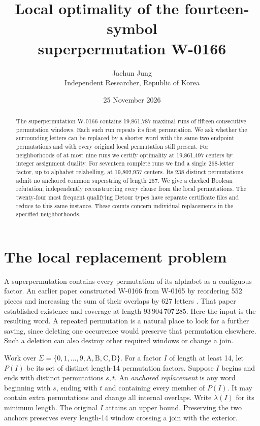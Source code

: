 \documentclass[11pt]{article}
\title{\bfseries Local optimality of the fourteen-symbol\\superpermutation W-0166}
\author{Jaehun Jung\\[3pt]\small Independent Researcher, Republic of Korea}
\date{25 November 2026}
\begin{document}
\maketitle
\begin{abstract}
The superpermutation W-0166 contains 19,861,787 maximal runs of fifteen consecutive permutation windows. Each such run repeats its first permutation. We ask whether the surrounding letters can be replaced by a shorter word with the same two endpoint permutations and with every original local permutation still present. For neighborhoods of at most nine runs we certify optimality at 19,861,497 centers by integer assignment duality. For seventeen complete runs we find a single 268-letter factor, up to alphabet relabelling, at 19,802,957 centers. Its 238 distinct permutations admit no anchored common superstring of length 267. We give a checked Boolean refutation, independently reconstructing every clause from the local permutations. The twenty-four most frequent qualifying Detour types have separate certificate files and reduce to this same instance. These counts concern individual replacements in the specified neighborhoods.
\end{abstract}

\section{The local replacement problem}
A superpermutation contains every permutation of its alphabet as a contiguous factor. An earlier paper constructed W-0166 from W-0165 by reordering 552 pieces and increasing the sum of their overlaps by 627 letters \cite{construction,word}. That paper established existence and coverage at length \(93\,904\,707\,285\). Here the input is the resulting word. A repeated permutation is a natural place to look for a further saving, since deleting one occurrence would preserve that permutation elsewhere. Such a deletion can also destroy other required windows or change a join.

Work over \(\Sigma=\{0,1,\ldots,9,\mathrm A,\mathrm B,\mathrm C,\mathrm D\}\). For a factor \(I\) of length at least 14, let \(P(I)\) be its set of distinct length-14 permutation factors. Suppose \(I\) begins and ends with distinct permutations \(s,t\). An \emph{anchored replacement} is any word beginning with \(s\), ending with \(t\) and containing every member of \(P(I)\). It may contain extra permutations and change all internal overlaps. Write \(\lambda(I)\) for its minimum length. The original \(I\) attains an upper bound. Preserving the two anchors preserves every length-14 window crossing a join with the exterior.
\end{document}
